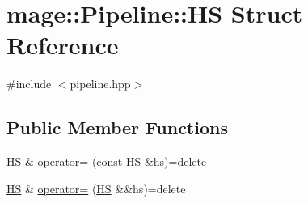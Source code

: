 \hypertarget{structmage_1_1_pipeline_1_1_h_s}{}\section{mage\+:\+:Pipeline\+:\+:HS Struct Reference}
\label{structmage_1_1_pipeline_1_1_h_s}


{\ttfamily \#include $<$pipeline.\+hpp$>$}

\subsection*{Public Member Functions}
\begin{DoxyCompactItemize}
\item 
\hyperlink{structmage_1_1_pipeline_1_1_h_s}{HS} \& \hyperlink{structmage_1_1_pipeline_1_1_h_s_ad45e32a35b77a40cf683cb29961c4c8d}{operator=} (const \hyperlink{structmage_1_1_pipeline_1_1_h_s}{HS} \&hs)=delete
\item 
\hyperlink{structmage_1_1_pipeline_1_1_h_s}{HS} \& \hyperlink{structmage_1_1_pipeline_1_1_h_s_a9d264db1a5eeb9050eda11457920949f}{operator=} (\hyperlink{structmage_1_1_pipeline_1_1_h_s}{HS} \&\&hs)=delete
\end{DoxyCompactItemize}
